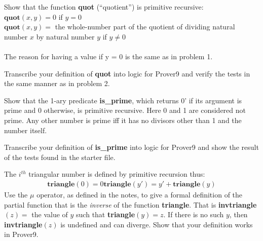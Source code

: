 \documentclass[12pt,hidelinks,letterpaper,boxed,cm]{hmcpset}
\newcommand{\tb}[1]{\textbf{#1}}
\begin{document}
\begin{solution}
    \vfill
\end{solution}
\newpage

\begin{problem}[7.]
    [3 points] Show that the function \tb{quot} (“quotient”) is primitive recursive:\\
    $\bm{quot}(x, y) = 0$ if $y = 0$\\
    $\bm{quot}(x, y) =$ the whole-number part of the quotient of dividing natural number $x$ by natural number $y$ if $y \ne 0$\\\\
    The reason for having a value if y = 0 is the same as in problem 1.
\end{problem}

\begin{solution}
    \vfill
\end{solution}
\newpage

\begin{problem}[8.]
    [3 points] Transcribe your definition of \tb{quot} into logic for Prover9 and verify the tests in the same manner as in problem 2.
\end{problem}

\begin{solution}
    \vfill
\end{solution}
\newpage

\begin{problem}[9.]
    [6 points] Show that the 1-ary predicate \tb{is\_prime}, which returns 0' if its argument is prime and 0 otherwise, is primitive recursive. Here 0 and 1 are considered not prime. Any other number is prime iff it has no divisors other than 1 and the number itself.
\end{problem}

\begin{solution}
    \vfill
\end{solution}
\newpage

\begin{problem}[10.]
    [5 points] Transcribe your definition of \tb{is\_prime} into logic for Prover9 and show the result of the tests found in the starter file.
\end{problem}

\begin{solution}
    \vfill
\end{solution}
\newpage

\begin{problem}[11.]
    [3 points] The $i^{th}$ triangular number is defined by primitive recursion thus:
        \begin{align*}
            \tb{triangle}(0) = 0
            \tb{triangle}(y') = y'+ \tb{triangle}(y)            
        \end{align*}
    Use the $\mu$ operator, as defined in the notes, to give a formal definition of the partial function that is the \emph{inverse} of the function \tb{triangle}. That is \tb{invtriangle}$(z) =$ the value of $y$ such that \tb{triangle}$(y) = z$. If there is no such $y$, then \tb{invtriangle}$(z)$ is undefined and can diverge. Show that your definition works in Prover9.
\end{problem}
\end{document}
